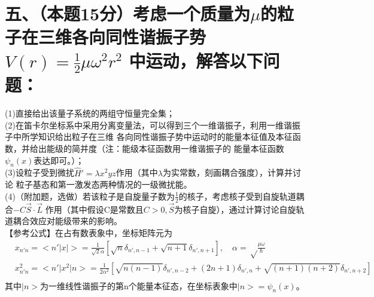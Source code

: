\documentclass[UTF8]{ctexart}
\begin{document}
\section*{五、（本题15分）考虑一个质量为$\mu$的粒子在三维各向同性谐振子势$V(r)=\frac{1}{2}\mu\omega^2r^2$
  中运动，解答以下问题：}
 (1)直接给出该量子系统的两组守恒量完全集；\\
(2)在笛卡尔坐标系中采用分离变量法，可以得到三个一维谐振子，利用一维谐振子中所学知识给出粒子在三维
各向同性谐振子势中运动时的能量本征值及本征函数，并给出能级的简并度（注：能级本征函数用一维谐振子的
能量本征函数$\psi_n(x)$表达即可。）；\\
(3)设粒子受到微扰$\hat H'=\lambda x^2yz$作用（其中$\lambda$为实常数，刻画耦合强度），计算并讨论
粒子基态和第一激发态两种情况的一级微扰能。\\
(4)（附加题，选做）若该粒子是自旋量子数为$\frac{1}{2}$的核子，考虑核子受到自旋轨道耦合$-C\vec S\cdot\vec L$
作用（其中假设C是常数且$C>0,\vec S$为核子自旋），通过计算讨论自旋轨道耦合效应对能级带来的影响。\\
【参考公式】在占有数表象中，坐标矩阵元为
\begin{equation*}
  \begin{aligned}
     & x_{n'n}=<n'\lvert x\rvert>=\frac{1}{\sqrt2\alpha}[\sqrt n\delta_{n',n-1}
    +\sqrt{n+1}\delta_{n',n+1}],\quad\alpha=\sqrt\frac{\mu\omega}{\hbar}                 \\
     & x^2_{n'n}=<n'\lvert x^2\rvert n>=\frac{1}{2\alpha^2}[\sqrt{n(n-1)}\delta_{n',n-2}
    +(2n+1)\delta_{n',n}+\sqrt{(n+1)(n+2)}\delta_{n',n+2}]                               \\
  \end{aligned}
\end{equation*}
其中$\lvert n>$为一维线性谐振子的第n个能量本征态，在坐标表象中$\lvert n>=\psi_n(x)$。\\
\end{document}
